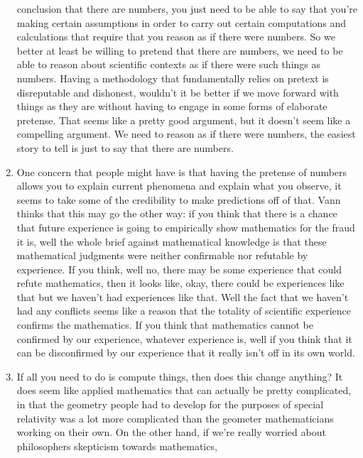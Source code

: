 \documentclass[12pt]{article}
\theoremstyle{definition}
\begin{document}
\begin{enumerate}
        conclusion that there are numbers, you just need to be able to say that
        you're making certain assumptions in order to carry out certain
        computations and calculations that require that you reason as if there
        were numbers. So we better at least be willing to pretend that there
        are numbers, we need to be able to reason about scientific contexts as
        if there were such things as numbers. Having a methodology that
        fundamentally relies on pretext is disreputable and dishonest, wouldn't
        it be better if we move forward with things as they are without having
        to engage in some forms of elaborate pretense. That seems like a pretty
        good argument, but it doesn't seem like a compelling argument. We need
        to reason as if there were numbers, the easiest story to tell is just
        to say that there are numbers.
    \item
        One concern that people might have is that having the pretense of
        numbers allows you to explain current phenomena and explain what you
        observe, it seems to take some of the credibility to make predictions
        off of that. Vann thinks that this may go the other way: if you think
        that there is a chance that future experience is going to empirically
        show mathematics for the fraud it is, well the whole brief against
        mathematical knowledge is that these mathematical judgments were
        neither confirmable nor refutable by experience. If you think, well no,
        there may be some experience that could refute mathematics, then it
        looks like, okay, there could be experiences like that but we haven't
        had experiences like that. Well the fact that we haven't had any
        conflicts seems like a reason that the totality of scientific
        experience confirms the mathematics. If you think that mathematics
        cannot be confirmed by our experience, whatever experience is, well if
        you think that it can be disconfirmed by our experience that it really
        isn't off in its own world. 
    \item
        If all you need to do is compute things, then does this change
        anything? It does seem like applied mathematics that can actually be
        pretty complicated, in that the geometry people had to develop for the
        purposes of special relativity was a lot more complicated than the
        geometer mathematicians working on their own. On the other hand, if
        we're really worried about philosophers skepticism towards mathematics,

\end{enumerate}
\end{document}
